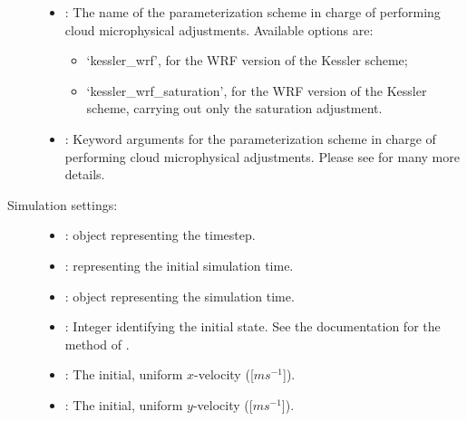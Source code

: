 \documentclass[letterpaper,10pt,english]{sphinxmanual}
\begin{document}
\begin{description}
\begin{itemize}
\item {} 
: The name of the parameterization scheme in charge              of performing cloud microphysical adjustments. Available options are:
\begin{itemize}
\item {} 
‘kessler\_wrf’, for the WRF version of the Kessler scheme;

\item {} 
‘kessler\_wrf\_saturation’, for the WRF version of the Kessler scheme,                          carrying out only the saturation adjustment.

\end{itemize}

\item {} 
: Keyword arguments for the parameterization scheme            in charge of performing cloud microphysical adjustments. Please see              for many more details.

\end{itemize}

\item[{Simulation settings:}] \leavevmode\begin{itemize}
\item {} 
:  object representing the timestep.

\item {} 
:  representing the initial simulation time.

\item {} 
:  object representing the simulation time.

\item {} 
: Integer identifying the initial state. See the documentation for the method               of               .

\item {} 
: The initial, uniform \(x\)-velocity ({[}\(m s^{-1}\){]}).

\item {} 
: The initial, uniform \(y\)-velocity ({[}\(m s^{-1}\){]}).


\end{itemize}
\end{description}
\end{document}
